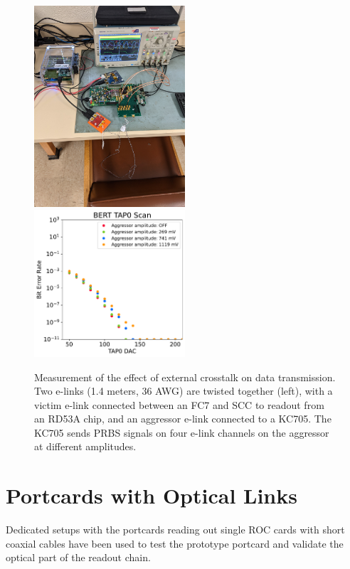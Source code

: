 \documentclass[a4paper,11pt]{article}
\begin{document}
\begin{figure}[htbp]
\centering
\includegraphics[width=0.5\textwidth,origin=c,angle=270]{../figures/external_crosstalk_setup.jpg}
\qquad
\includegraphics[width=0.5\textwidth,origin=c]{../figures/BERT_TAP0_Scan_External_Crosstalk.pdf}
\caption{
\label{fig:external_crosstalk}
Measurement of the effect of external crosstalk on data transmission.
Two e-links (1.4 meters, 36 AWG) are twisted together (left), with a victim e-link connected between an FC7 and SCC to readout from an RD53A chip, and an aggressor e-link connected to a KC705.
The KC705 sends PRBS signals on four e-link channels on the aggressor at different amplitudes.
}
\end{figure}

\section{Portcards with Optical Links}
\label{sec:optical}

Dedicated setups with the portcards reading out single ROC cards with short coaxial cables have been used to test the prototype portcard and validate the optical part of the readout chain.
\end{document}
